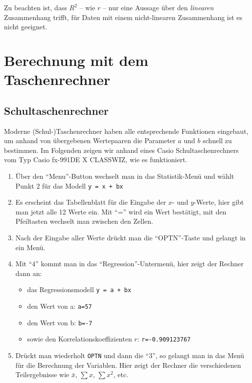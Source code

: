 \documentclass[ngerman, 12pt]{scrartcl}
\begin{document}
Zu beachten ist, dass \(R^2\) -- wie \(r\) -- nur eine Aussage über den \textit{linearen} Zusammenhang trifft, für Daten mit einem nicht-linearen Zusammenhang ist es nicht geeignet.

\section{Berechnung mit dem Taschenrechner}

\subsection{Schultaschenrechner}

Moderne (Schul-)Taschenrechner haben alle entsprechende Funktionen eingebaut, um anhand von übergebenen Wertepaaren die Parameter $a$ und $b$ schnell zu bestimmen. Im Folgenden zeigen wir anhand eines Casio Schultaschenrechners vom Typ Casio fx-991DE X CLASSWIZ, wie es funktioniert. 

\begin{enumerate}
	\item Über den \enquote{Menu}-Button wechselt man in das Statistik-Menü und wählt Punkt 2 für das Modell \texttt{y = x + bx}
	\item Es erscheint das Tabellenblatt für die Eingabe der $x$- und $y$-Werte, hier gibt man jetzt alle 12 Werte ein. Mit \enquote{=} wird ein Wert bestätigt, mit den Pfeiltasten wechselt man zwischen den Zellen.
	\item Nach der Eingabe aller Werte drückt man die \enquote{OPTN}-Taste und gelangt in ein Menü.
	\item Mit \enquote{4} kommt man in das \enquote{Regression}-Untermenü, hier zeigt der Rechner dann an:
	
	\begin{itemize}
		\item das Regressionsmodell \texttt{y = a + bx}
		\item den Wert von a: \texttt{a=57}
		\item den Wert von b: \texttt{b=-7}
		\item sowie den Korrelationskoeffizienten \(r\): \texttt{r=-0.909123767}
		\end{itemize}
	
	\item Drückt man wiederholt \texttt{OPTN} und dann die \enquote{3}, so gelangt man in das Menü für die Berechnung der Variablen. Hier zeigt der Rechner die verschiedenen Teilergebnisse wie \(\bar{x}\), \(\sum{x}\), \(\sum{x^2}\), etc.
	\end{enumerate}
\end{document}
